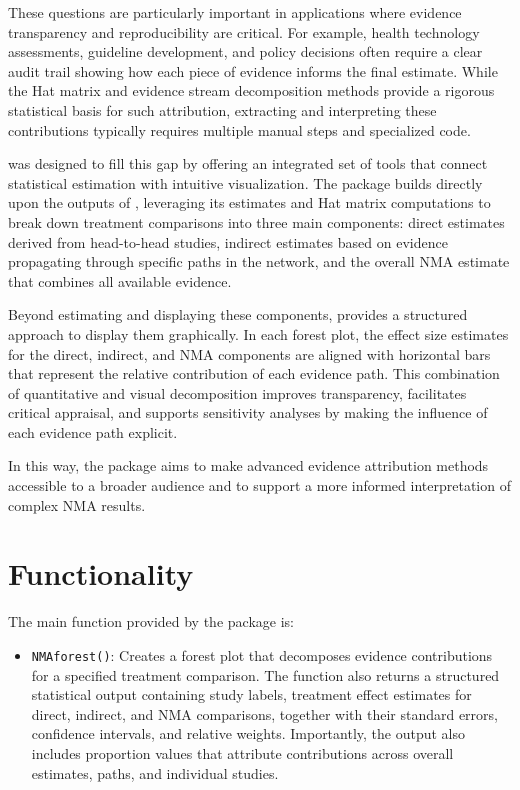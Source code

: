 These questions are particularly important in applications where evidence transparency and reproducibility are critical. For example, health technology assessments, guideline development, and policy decisions often require a clear audit trail showing how each piece of evidence informs the final estimate. While the Hat matrix and evidence stream decomposition methods provide a rigorous statistical basis for such attribution, extracting and interpreting these contributions typically requires multiple manual steps and specialized code.

 was designed to fill this gap by offering an integrated set of tools that connect statistical estimation with intuitive visualization. The package builds directly upon the outputs of , leveraging its estimates and Hat matrix computations to break down treatment comparisons into three main components: direct estimates derived from head-to-head studies, indirect estimates based on evidence propagating through specific paths in the network, and the overall NMA estimate that combines all available evidence.

Beyond estimating and displaying these components,  provides a structured approach to display them graphically. In each forest plot, the effect size estimates for the direct, indirect, and NMA components are aligned with horizontal bars that represent the relative contribution of each evidence path. This combination of quantitative and visual decomposition improves transparency, facilitates critical appraisal, and supports sensitivity analyses by making the influence of each evidence path explicit.

In this way, the package aims to make advanced evidence attribution methods accessible to a broader audience and to support a more informed interpretation of complex NMA results.

\section{Functionality}

The main function provided by the package is:

\begin{itemize}
  \item \texttt{NMAforest()}: Creates a forest plot that decomposes evidence contributions for a specified treatment comparison. The function also returns a structured statistical output containing study labels, treatment effect estimates for direct, indirect, and NMA comparisons, together with their standard errors, confidence intervals, and relative weights. Importantly, the output also includes proportion values that attribute contributions across overall estimates, paths, and individual studies.
\end{itemize}

